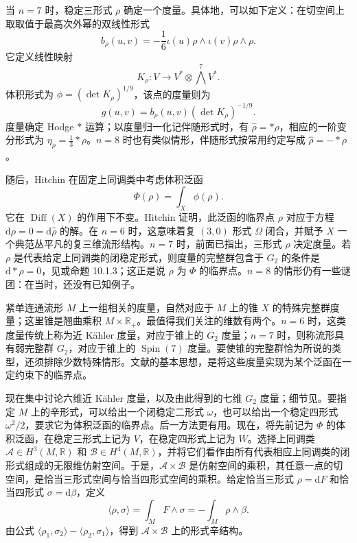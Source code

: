 当 $n=7$ 时，稳定三形式 $\rho$ 确定一个度量。具体地，可以如下定义：在切空间上取取值于最高次外幂的双线性形式
\[
b_\rho(u,v)=-\frac16\iota(u)\rho\wedge\iota(v)\rho\wedge\rho.
\]
它定义线性映射
\[
K_\rho\colon V\longrightarrow V^*\otimes\bigwedge^7V^*.
\]
体积形式为 $\phi=(\det K_\rho)^{1/9}$，该点的度量则为
\[
g(u,v)=b_\rho(u,v)(\det K_\rho)^{-1/9}.
\]
度量确定 Hodge $*$ 运算；以度量归一化记伴随形式时，有 $\widehat\rho=*\rho$，相应的一阶变分形式为 $\eta_\rho=\tfrac13*\rho$。$n=8$ 时也有类似情形，伴随形式按常用约定写成 $\widehat\rho=-*\rho$。

随后，Hitchin 在固定上同调类中考虑体积泛函
\[
\Phi(\rho)=\int_X\phi(\rho).
\]
它在 $\operatorname{Diff}(X)$ 的作用下不变。Hitchin 证明，此泛函的临界点 $\rho$ 对应于方程 $\mathrm d\rho=0=\mathrm d\widehat\rho$ 的解。在 $n=6$ 时，这意味着复 $(3,0)$ 形式 $\Omega$ 闭合，并赋予 $X$ 一个典范丛平凡的复三维流形结构。$n=7$ 时，前面已指出，三形式 $\rho$ 决定度量。若 $\rho$ 是代表给定上同调类的闭稳定形式，则度量的完整群包含于 $G_2$ 的条件是 $\mathrm d*\rho=0$，见或命题 10.1.3；这正是说 $\rho$ 为 $\Phi$ 的临界点。$n=8$ 的情形仍有一些谜团：在当时，还没有已知例子。

紧单连通流形 $M$ 上一组相关的度量，自然对应于 $M$ 上的锥 $X$ 的特殊完整群度量；这里锥是翘曲乘积 $M\times\mathbb R_+$。最值得我们关注的维数有两个。$n=6$ 时，这类度量传统上称为近 Kähler 度量，对应于锥上的 $G_2$ 度量；$n=7$ 时，则称流形具有弱完整群 $G_2$，对应于锥上的 $\operatorname{Spin}(7)$ 度量。要使锥的完整群恰为所说的类型，还须排除少数特殊情形。文献的基本思想，是将这些度量实现为某个泛函在一定约束下的临界点。

现在集中讨论六维近 Kähler 度量，以及由此得到的七维 $G_2$ 度量；细节见。要指定 $M$ 上的辛形式，可以给出一个闭稳定二形式 $\omega$，也可以给出一个稳定四形式 $\omega^2/2$，要求它为体积泛函的临界点。后一方法更有用。现在，将先前记为 $\Phi$ 的体积泛函，在稳定三形式上记为 $V$，在稳定四形式上记为 $W$。选择上同调类 $\mathcal A\in H^3(M,\mathbb R)$ 和 $\mathcal B\in H^4(M,\mathbb R)$，并将它们看作由所有代表相应上同调类的闭形式组成的无限维仿射空间。于是，$\mathcal A\times\mathcal B$ 是仿射空间的乘积，其任意一点的切空间，是恰当三形式空间与恰当四形式空间的乘积。给定恰当三形式 $\rho=\mathrm dF$ 和恰当四形式 $\sigma=\mathrm d\beta$，定义
\[
\langle\rho,\sigma\rangle=\int_MF\wedge\sigma
=-\int_M\rho\wedge\beta.
\]
由公式 $\langle\rho_1,\sigma_2\rangle-\langle\rho_2,\sigma_1\rangle$，得到 $\mathcal A\times\mathcal B$ 上的形式辛结构。

